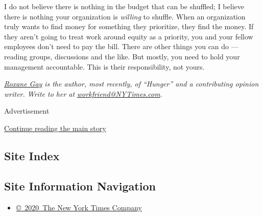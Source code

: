 I do not believe there is nothing in the budget that can be shuffled; I
believe there is nothing your organization is \emph{willing} to shuffle.
When an organization truly wants to find money for something they
prioritize, they find the money. If they aren't going to treat work
around equity as a priority, you and your fellow employees don't need to
pay the bill. There are other things you can do --- reading groups,
discussions and the like. But mostly, you need to hold your management
accountable. This is their responsibility, not yours.

\href{http://www.roxanegay.com/}{\emph{Roxane Gay}} \emph{is the author,
most recently, of ``Hunger'' and a contributing opinion writer. Write to
her at}
\href{mailto:workfriend@NYTimes.com}{\emph{workfriend@NYTimes.com}}.

Advertisement

\protect\hyperlink{after-bottom}{Continue reading the main story}

\hypertarget{site-index}{%
\subsection{Site Index}\label{site-index}}

\hypertarget{site-information-navigation}{%
\subsection{Site Information
Navigation}\label{site-information-navigation}}

\begin{itemize}
\tightlist
\item
  \href{https://help.nytimes3xbfgragh.onion/hc/en-us/articles/115014792127-Copyright-notice}{©~2020~The
  New York Times Company}
\end{itemize}

